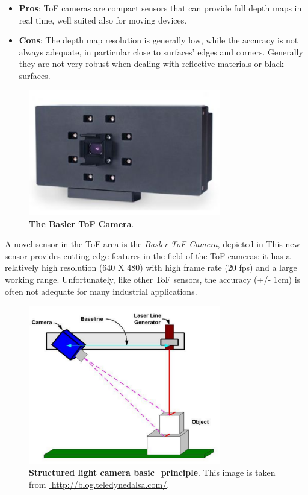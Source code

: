 \begin{itemize}
	\item \textbf{Pros}: ToF cameras are compact sensors that can provide full depth maps in real time, well suited also for moving devices.
	\item \textbf{Cons}: The depth map resolution is generally low, while the accuracy is not always adequate, in particular close to surfaces' edges and corners. Generally they are not very robust when dealing with reflective materials or black surfaces.
\end{itemize}

\begin{figure}
    \centering
    \includegraphics[width=0.75\textwidth]{figures/1_perception_and_sensing_in_robotics/basler_tof_camera}
    \caption{\textbf{The Basler ToF Camera}.} 
    \label{fig:basler_tof_camera}
\end{figure}

A novel sensor in the ToF area is the \emph{Basler ToF Camera}, depicted in  This new sensor provides cutting edge features in the field of the ToF cameras: it has a relatively high resolution (640 X 480) with high frame rate (20 fps) and a large working range. Unfortunately, like other ToF sensors, the accuracy (+/- 1cm) is often not adequate for many industrial applications.

\begin{figure}
    \centering
    \includegraphics[width=0.75\textwidth]{figures/1_perception_and_sensing_in_robotics/sl_sensors}
    \caption{\textbf{Structured light camera basic ​ principle}. This image is taken from \url{​ http://blog.teledynedalsa.com/​}.} 
    \label{fig:sl_sensors}
\end{figure}

